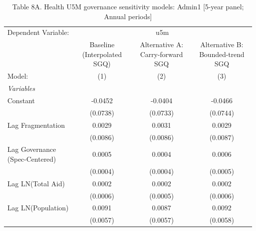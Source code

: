 
\begin{table}[H]
   \caption{Table 8A. Health U5M governance sensitivity models: Admin1 [5-year panel; Annual periods]}
   \centering
   \begin{tabular}{lccc}
      \tabularnewline \midrule \midrule
      Dependent Variable: & \multicolumn{3}{c}{u5m}\\
                                                         & Baseline (Interpolated SGQ) & Alternative A: Carry-forward SGQ & Alternative B: Bounded-trend SGQ \\   
      Model:                                             & (1)                         & (2)                              & (3)\\  
      \midrule
      \emph{Variables}\\
      Constant                                           & -0.0452                     & -0.0404                          & -0.0466\\   
                                                         & (0.0738)                    & (0.0733)                         & (0.0744)\\   
      Lag Fragmentation                                  & 0.0029                      & 0.0031                           & 0.0029\\   
                                                         & (0.0086)                    & (0.0086)                         & (0.0087)\\   
      Lag Governance (Spec-Centered)                     & 0.0005                      & 0.0004                           & 0.0006\\   
                                                         & (0.0004)                    & (0.0004)                         & (0.0005)\\   
      Lag LN(Total Aid)                                  & 0.0002                      & 0.0002                           & 0.0002\\   
                                                         & (0.0006)                    & (0.0005)                         & (0.0006)\\   
      Lag LN(Population)                                 & 0.0091                      & 0.0087                           & 0.0092\\   
                                                         & (0.0057)                    & (0.0057)                         & (0.0058)\\   

\end{tabular}
\end{table}
